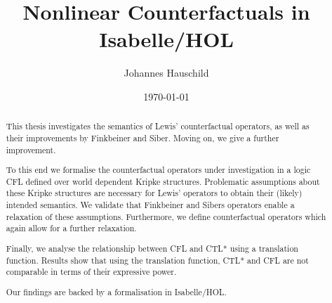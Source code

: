 \documentclass[10pt,a4paper]{article}
\title{ \textbf{Nonlinear Counterfactuals in Isabelle/HOL}}
\date{\today}
\author{Johannes Hauschild}
\begin{document}
\maketitle

\begin{abstract}
  This thesis investigates the semantics of Lewis' counterfactual operators, as well as their improvements by Finkbeiner and Siber. Moving on, we give a further improvement.

  To this end we formalise the counterfactual operators under investigation in a logic CFL defined over world dependent Kripke structures. 
  Problematic assumptions about these Kripke structures are necessary for Lewis' operators to obtain their (likely) intended semantics.
  We validate that Finkbeiner and Sibers operators enable a relaxation of these assumptions.
  Furthermore, we define counterfactual operators which again allow for a further relaxation.
  
  Finally, we analyse the relationship between CFL and CTL* using a translation function.
  Results show that using the translation function, CTL* and CFL are not comparable in terms of their expressive power.
  
  Our findings are backed by a formalisation in Isabelle/HOL.
\end{abstract}



{}


\end{document}
